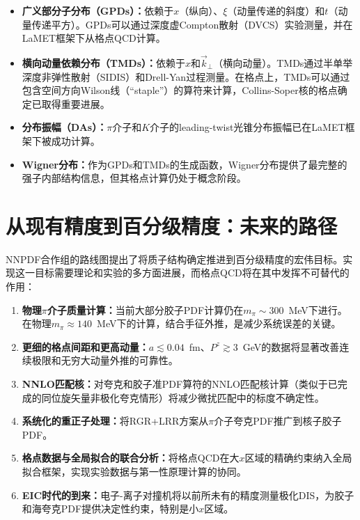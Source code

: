 \documentclass[12pt,a4paper]{ctexart}
\theoremstyle{definition}
\begin{document}
\begin{itemize}
    \item \textbf{广义部分子分布（GPDs）：}依赖于$x$（纵向）、$\xi$（动量传递的斜度）和$t$（动量传递平方）。GPDs可以通过深度虚Compton散射（DVCS）实验测量，并在LaMET框架下从格点QCD计算\cite{Yao2023}。

    \item \textbf{横向动量依赖分布（TMDs）：}依赖于$x$和$\vec{k}_\perp$（横向动量）。TMDs通过半单举深度非弹性散射（SIDIS）和Drell-Yan过程测量。在格点上，TMDs可以通过包含空间方向Wilson线（``staple''）的算符来计算，Collins-Soper核的格点确定已取得重要进展\cite{Ji2013Euclidean}。

    \item \textbf{分布振幅（DAs）：}$\pi$介子和$K$介子的leading-twist光锥分布振幅已在LaMET框架下被成功计算\cite{Yao2023,Ji2013Euclidean}。

    \item \textbf{Wigner分布：}作为GPDs和TMDs的生成函数，Wigner分布提供了最完整的强子内部结构信息，但其格点计算仍处于概念阶段\cite{Ji2013Euclidean}。
\end{itemize}

\section{从现有精度到百分级精度：未来的路径}

NNPDF合作组的路线图\cite{NNPDF40}提出了将质子结构确定推进到百分级精度的宏伟目标。实现这一目标需要理论和实验的多方面进展，而格点QCD将在其中发挥不可替代的作用：

\begin{enumerate}
    \item \textbf{物理$\pi$介子质量计算：}当前大部分胶子PDF计算仍在$m_\pi \sim 300$~MeV下进行。在物理$m_\pi \approx 140$~MeV下的计算，结合手征外推，是减少系统误差的关键。

    \item \textbf{更细的格点间距和更高动量：}$a \lesssim 0.04$~fm、$P^z \gtrsim 3$~GeV的数据将显著改善连续极限和无穷大动量外推的可靠性。

    \item \textbf{NNLO匹配核：}对夸克和胶子准PDF算符的NNLO匹配核计算（类似于已完成的同位旋矢量非极化夸克情形）将减少微扰匹配中的标度不确定性。

    \item \textbf{系统化的重正子处理：}将RGR+LRR方案从$\pi$介子夸克PDF\cite{Zhang2023RGR}推广到核子胶子PDF。

    \item \textbf{格点数据与全局拟合的联合分析：}将格点QCD在大$x$区域的精确约束纳入全局拟合框架，实现实验数据与第一性原理计算的协同。

    \item \textbf{EIC时代的到来：}电子-离子对撞机将以前所未有的精度测量极化DIS，为胶子和海夸克PDF提供决定性约束，特别是小$x$区域。
\end{enumerate}
\end{document}
